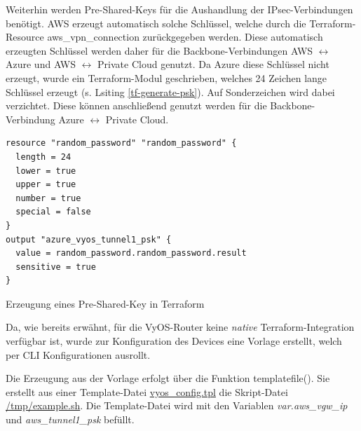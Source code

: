 Weiterhin werden Pre-Shared-Keys für die Aushandlung der IPsec-Verbindungen benötigt. AWS erzeugt automatisch solche Schlüssel, welche durch die Terraform-Resource \glqq aws\_vpn\_connection\grqq{} zurückgegeben werden. Diese automatisch erzeugten Schlüssel werden daher für die Backbone-Verbindungen AWS $\leftrightarrow$ Azure und AWS $\leftrightarrow$ Private Cloud genutzt. Da Azure diese Schlüssel nicht erzeugt, wurde ein Terraform-Modul geschrieben, welches 24 Zeichen lange Schlüssel erzeugt (s. Lsiting \ref{tf-generate-psk}). Auf Sonderzeichen wird dabei verzichtet. Diese können anschließend genutzt werden für die Backbone-Verbindung Azure $\leftrightarrow$ Private Cloud.
\begin{listing}[h]
\begin{verbatim}
resource "random_password" "random_password" {
  length = 24
  lower = true
  upper = true
  number = true
  special = false
}
output "azure_vyos_tunnel1_psk" {
  value = random_password.random_password.result
  sensitive = true
}
\end{verbatim}
\caption{Erzeugung eines Pre-Shared-Key in Terraform}
\label{tf-generate-psk}
\end{listing}\FloatBarrier
Da, wie bereits erwähnt, für die VyOS-Router keine \textit{native} Terraform-Integration verfügbar ist, wurde zur Konfiguration des Devices eine Vorlage erstellt, welch per CLI Konfigurationen ausrollt.

Die Erzeugung aus der Vorlage erfolgt über die Funktion templatefile()\cite{templatefiletf2021}. Sie erstellt aus einer Template-Datei \underline{vyos\_config.tpl} die Skript-Datei \underline{/tmp/example.sh}. Die Template-Datei wird mit den Variablen \textit{var.aws\_vgw\_ip} und \textit{aws\_tunnel1\_psk} befüllt.

